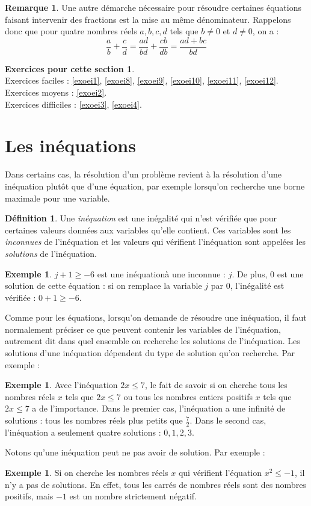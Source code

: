 \documentclass[a4paper,13pt]{scrreprt}
\theoremstyle{plain}
\theoremstyle{definition}
\newtheorem{déf}[subsection]{Définition}
\newtheorem{exe}[subsection]{Exemple}
\newtheorem{rema}[subsection]{Remarque}
\newtheorem*{epcs}{Exercices pour cette section}
\begin{document}
\newpage

\begin{rema}
	Une autre démarche nécessaire pour résoudre certaines équations faisant intervenir des fractions est la mise au même dénominateur. Rappelons donc que pour quatre nombres réels $a,b,c,d$ tels que $b \ne 0$ et $d \ne 0$, on a :$$\frac{a}{b}+\frac{c}{d}=\frac{ad}{bd}+\frac{cb}{db}=\frac{ad+bc}{bd}$$
\end{rema}

\begin{epcs}
	~~\\
	Exercices faciles : \ref{exoei1}, \ref{exoei8}, \ref{exoei9}, \ref{exoei10}, \ref{exoei11}, \ref{exoei12}.\\
	Exercices moyens : \ref{exoei2}.\\
	Exercices difficiles : \ref{exoei3}, \ref{exoei4}.
\end{epcs}

\section{Les inéquations} \label{sectioninequation}

Dans certains cas, la résolution d'un problème revient à la résolution d'une inéquation plutôt que d'une équation, par exemple lorsqu'on recherche une borne maximale pour une variable.

\begin{déf}
	Une \emph{inéquation} est une inégalité qui n'est vérifiée que pour certaines valeurs données aux variables qu'elle contient. Ces variables sont les \emph{inconnues} de l'inéquation et les valeurs qui vérifient l'inéquation sont appelées les \emph{solutions} de l'inéquation.
\end{déf}
\begin{exe}
	$j+1 \ge -6$ est une inéquationà une inconnue : $j$. De plus, $0$ est une solution de cette équation : si on remplace la variable $j$ par $0$, l'inégalité est vérifiée : $0+1 \ge -6$.
\end{exe}
Comme pour les équations, lorsqu'on demande de résoudre une inéquation, il faut normalement préciser ce que peuvent contenir les variables de l'inéquation, autrement dit dans quel ensemble on recherche les solutions de l'inéquation. Les solutions d'une inéquation dépendent du type de solution qu'on recherche. Par exemple :
\begin{exe}
	Avec l'inéquation $2x \le 7$, le fait de savoir si on cherche tous les nombres réels $x$ tels que $2x \le 7$ ou tous les nombres entiers positifs $x$ tels que $2x \le 7$ a de l'importance. Dans le premier cas, l'inéquation a une infinité de solutions : tous les nombres réels plus petits que $\frac{7}{2}$. Dans le second cas, l'inéquation a seulement quatre solutions : $0,1,2,3$.
\end{exe}
Notons qu'une inéquation peut ne pas avoir de solution. Par exemple :
\begin{exe}
	Si on cherche les nombres réels $x$ qui vérifient l'équation $x^2 \le -1$, il n'y a pas de solutions. En effet, tous les carrés de nombres réels sont des nombres positifs, mais $-1$ est un nombre strictement négatif.
\end{exe}
\end{document}
